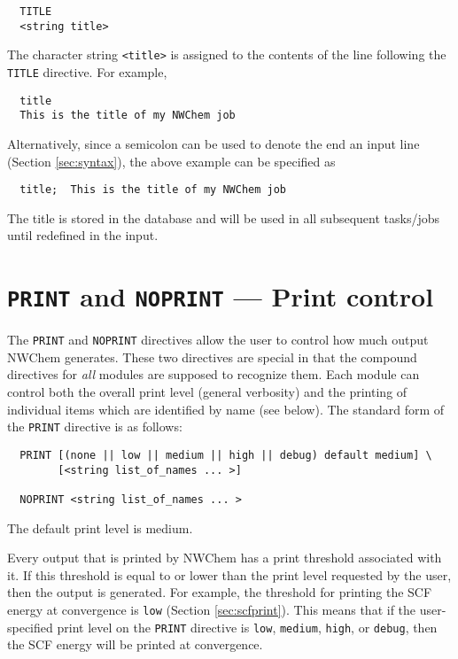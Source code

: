 \begin{verbatim}
  TITLE 
  <string title>
\end{verbatim}

The character string \verb+<title>+ is assigned to the contents of the
line following the \verb+TITLE+ directive.  For example,

\begin{verbatim}
  title
  This is the title of my NWChem job
\end{verbatim}

Alternatively, since a semicolon can be used to denote the end an input line
(Section \ref{sec:syntax}), the above example can be specified as

\begin{verbatim}
  title;  This is the title of my NWChem job
\end{verbatim}

The title is stored in the database and will be used in all subsequent
tasks/jobs until redefined in the input.

\section{{\tt PRINT} and {\tt NOPRINT} --- Print control}
\label{sec:printcontrol}

The \verb+PRINT+ and \verb+NOPRINT+ directives allow the user to
control how much output NWChem generates.  These two directives are
special in that the compound directives for {\em all} modules are
supposed to recognize them. Each module can control both the overall
print level (general verbosity) and the printing of individual items
which are identified by name (see below).  The standard form of the
\verb+PRINT+ directive is as follows:

\begin{verbatim}
  PRINT [(none || low || medium || high || debug) default medium] \
        [<string list_of_names ... >]

  NOPRINT <string list_of_names ... >
\end{verbatim}
The default print level is medium.

Every output that is printed by NWChem has a print threshold
associated with it. If this threshold is equal to or lower than the
print level requested by the user, then the output is generated.  For
example, the threshold for printing the SCF energy at convergence is
\verb+low+ (Section \ref{sec:scfprint}).  This means that if the
user-specified print level on the \verb+PRINT+ directive is
\verb+low+, \verb+medium+, \verb+high+, or \verb+debug+, then the SCF
energy will be printed at convergence.

